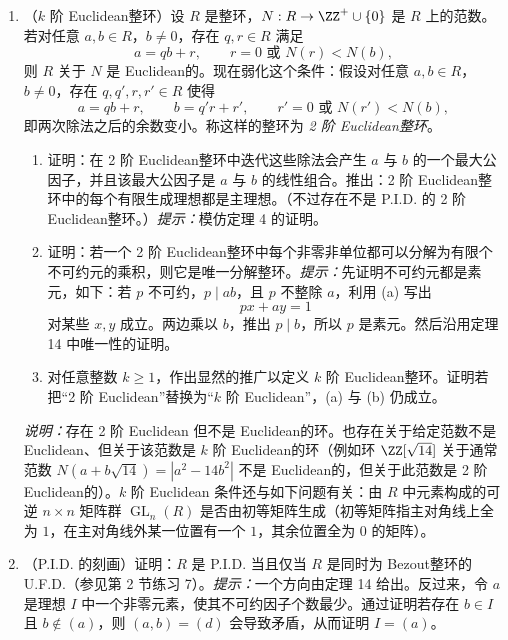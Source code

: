 \begin{enumerate}[label=\arabic*.]
	\item （$k$ 阶 Euclidean整环）设 $R$ 是整环，$N:R\to\ZZ^+\cup\{0\}$ 是 $R$ 上的范数。若对任意 $a,b\in R$，$b\neq0$，存在 $q,r\in R$ 满足
	\[
	a=qb+r,
	\qquad r=0\text{ 或 }N(r)<N(b),
	\]
	则 $R$ 关于 $N$ 是 Euclidean的。现在弱化这个条件：假设对任意 $a,b\in R$，$b\neq0$，存在 $q,q',r,r'\in R$ 使得
	\[
	a=qb+r,
	\qquad
	b=q'r+r',
	\qquad r'=0\text{ 或 }N(r')<N(b),
	\]
	即两次除法之后的余数变小。称这样的整环为 \emph{2 阶 Euclidean整环}。
	\begin{enumerate}[label=(\alph*)]
		\item 证明：在 2 阶 Euclidean整环中迭代这些除法会产生 $a$ 与 $b$ 的一个最大公因子，并且该最大公因子是 $a$ 与 $b$ 的线性组合。推出：2 阶 Euclidean整环中的每个有限生成理想都是主理想。（不过存在不是 P.I.D. 的 2 阶 Euclidean整环。）\emph{提示：}模仿定理 4 的证明。
		\item 证明：若一个 2 阶 Euclidean整环中每个非零非单位都可以分解为有限个不可约元的乘积，则它是唯一分解整环。\emph{提示：}先证明不可约元都是素元，如下：若 $p$ 不可约，$p\mid ab$，且 $p$ 不整除 $a$，利用 (a) 写出
		\[
		px+ay=1
		\]
		对某些 $x,y$ 成立。两边乘以 $b$，推出 $p\mid b$，所以 $p$ 是素元。然后沿用定理 14 中唯一性的证明。
		\item 对任意整数 $k\geq1$，作出显然的推广以定义 $k$ 阶 Euclidean整环。证明若把“2 阶 Euclidean”替换为“$k$ 阶 Euclidean”，(a) 与 (b) 仍成立。
	\end{enumerate}
	
	\noindent\emph{说明：}存在 2 阶 Euclidean 但不是 Euclidean的环。也存在关于给定范数不是 Euclidean、但关于该范数是 $k$ 阶 Euclidean的环（例如环 $\ZZ[\sqrt{14}]$ 关于通常范数 $N(a+b\sqrt{14})=|a^2-14b^2|$ 不是 Euclidean的，但关于此范数是 2 阶 Euclidean的）。$k$ 阶 Euclidean 条件还与如下问题有关：由 $R$ 中元素构成的可逆 $n\times n$ 矩阵群 $\operatorname{GL}_n(R)$ 是否由初等矩阵生成（初等矩阵指主对角线上全为 $1$，在主对角线外某一位置有一个 $1$，其余位置全为 $0$ 的矩阵）。
	
	\item （P.I.D. 的刻画）证明：$R$ 是 P.I.D. 当且仅当 $R$ 是同时为 Bezout整环的 U.F.D.（参见第 2 节练习 7）。\emph{提示：}一个方向由定理 14 给出。反过来，令 $a$ 是理想 $I$ 中一个非零元素，使其不可约因子个数最少。通过证明若存在 $b\in I$ 且 $b\notin(a)$，则 $(a,b)=(d)$ 会导致矛盾，从而证明 $I=(a)$。
\end{enumerate}
